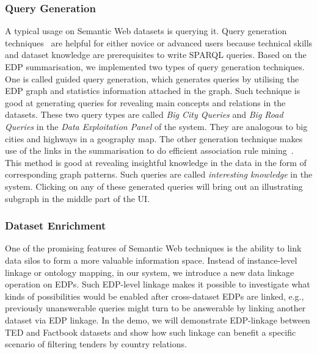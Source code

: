 \subsubsection{Query Generation}
A typical usage on Semantic Web datasets is querying it. Query generation techniques~\cite{pan2013query} are helpful for either novice or advanced users because technical skills and dataset knowledge are prerequisites to write SPARQL queries. Based on the EDP summarisation, we implemented two types of query generation techniques. One is called guided query generation, which generates queries by utilising the EDP graph and statistics information attached in the graph. Such technique is good at generating queries for revealing main concepts and relations in the datasets. These two query types are called \emph{Big City Queries} and \emph{Big Road Queries} in the \emph{Data Exploitation Panel} of the system. They are analogous to big cities and highways in a geography map. The other generation technique makes use of the links in the summarisation to do efficient association rule mining~\cite{pan2013query}. This method is good at revealing insightful knowledge in the data in the form of corresponding graph patterns. Such queries are called \emph{interesting knowledge} in the system. Clicking on any of these generated queries will bring out an illustrating subgraph in the middle part of the UI.  

\vspace{-3ex}
\subsubsection{Dataset Enrichment}
One of the promising features of Semantic Web techniques is the ability to link data silos to form a more valuable information space. Instead of instance-level linkage or ontology mapping, in our system, we introduce a new data linkage operation on EDPs. Such EDP-level linkage makes it possible to investigate what kinds of possibilities would be enabled after cross-dataset EDPs are linked, e.g., previously unanswerable queries might turn to be answerable by linking another dataset via EDP linkage. In the demo, we will demonstrate EDP-linkage between TED and Factbook datasets and show how such linkage can benefit a specific scenario of filtering tenders by country relations.

